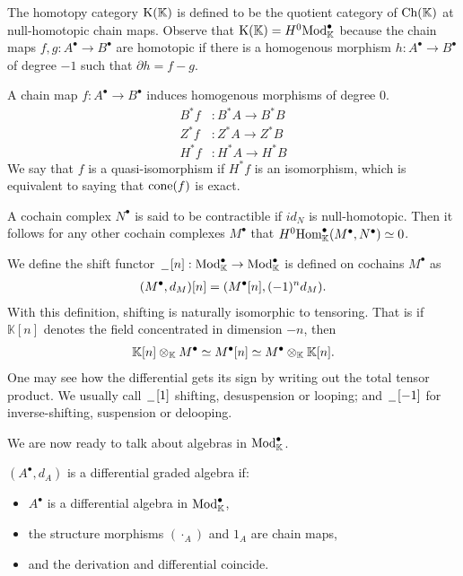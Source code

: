 \documentclass[../thesis.tex]{subfiles}
\begin{document}
            The homotopy category $\tt{K}(\mathbb{K})$ is defined to be the quotient category of $\tt{Ch}(\mathbb{K})$ at null-homotopic chain maps. Observe that $\tt{K}(\mathbb{K}) = H^0\tt{Mod}_\mathbb{K}^\bullet$ because the chain maps $f, g: A^\bullet \rightarrow B^\bullet$ are homotopic if there is a homogenous morphism $h: A^\bullet \rightarrow B^\bullet$ of degree $-1$ such that $\partial h = f - g$.

            A chain map $f: A^\bullet \rightarrow B^\bullet$ induces homogenous morphisms of degree $0$.
            \begin{align*}
                B^*f & : B^*A \rightarrow B^*B \\
                Z^*f & : Z^*A \rightarrow Z^*B \\
                H^*f & : H^*A \rightarrow H^*B
            \end{align*}
            We say that $f$ is a quasi-isomorphism if $H^*f$ is an isomorphism, which is equivalent to saying that $\tt{cone}(f)$ is exact.

            A cochain complex $N^\bullet$ is said to be contractible if $id_N$ is null-homotopic. Then it follows for any other cochain complexes $M^\bullet$ that $H^0\tt{Hom}_\mathbb{K}^\bullet(M^\bullet, N^\bullet) \simeq 0$.

            We define the shift functor $\argument [n] : \tt{Mod}_\mathbb{K}^\bullet \rightarrow \tt{Mod}_\mathbb{K}^\bullet$ is defined on cochains $M^\bullet$ as
            \begin{align*}
                (M^\bullet, d_M)[n] = (M^\bullet[n], (-1)^nd_M)\tt{.}
            \end{align*}
            With this definition, shifting is naturally isomorphic to tensoring. That is if $\mathbb{K}[n]$ denotes the field concentrated in dimension $-n$, then
            \begin{align*}
                \mathbb{K}[n]\otimes_\mathbb{K} M^\bullet \simeq M^\bullet[n]\simeq M^\bullet\otimes_\mathbb{K}\mathbb{K}[n]\tt{.}
            \end{align*}
            One may see how the differential gets its sign by writing out the total tensor product. We usually call $\argument[1]$ shifting, desuspension or looping; and $\argument[-1]$ for inverse-shifting, suspension or delooping.

            We are now ready to talk about algebras in $\tt{Mod}_\mathbb{K}^\bullet$.

            \begin{definition}
                $(A^\bullet,d_A)$ is a differential graded algebra if:
                \begin{itemize}
                    \item $A^\bullet$ is a differential algebra in $\tt{Mod}_\mathbb{K}^\bullet$,
                    \item the structure morphisms $(\cdot_A)$ and $1_A$ are chain maps,
                    \item and the derivation and differential coincide.
                \end{itemize}
            \end{definition}
\end{document}
